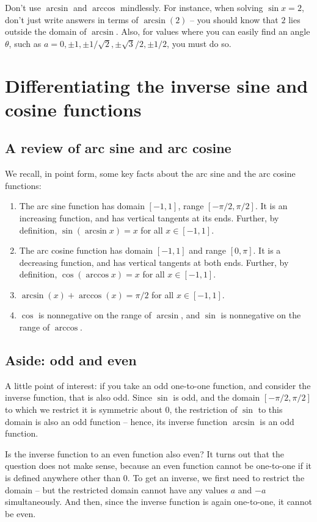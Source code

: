 \documentclass{amsart}
\begin{document}
Don't use $\arcsin$ and $\arccos$ mindlessly. For instance, when
solving $\sin x = 2$, don't just write answers in terms of
$\arcsin(2)$ -- you should know that $2$ lies outside the domain of
$\arcsin$. Also, for values where you can easily find an angle
$\theta$, such as $a = 0, \pm 1, \pm 1/\sqrt{2}, \pm \sqrt{3}/2, \pm
1/2$, you must do so.

\section{Differentiating the inverse sine and cosine functions}

\subsection{A review of arc sine and arc cosine}

We recall, in point form, some key facts about the arc sine and the
arc cosine functions:

\begin{enumerate}
\item The arc sine function has domain $[-1,1]$, range
  $[-\pi/2,\pi/2]$. It is an increasing function, and has vertical
  tangents at its ends. Further, by definition, $\sin(\arcsin x) = x$
  for all $x \in [-1,1]$.
\item The arc cosine function has domain $[-1,1]$ and range
  $[0,\pi]$. It is a decreasing function, and has vertical tangents at
  both ends. Further, by definition, $\cos(\arccos x) = x$ for all $x
  \in [-1,1]$.
\item $\arcsin(x) + \arccos(x) = \pi/2$ for all $x \in [-1,1]$.
\item $\cos$ is nonnegative on the range of $\arcsin$, and $\sin$ is
  nonnegative on the range of $\arccos$.
\end{enumerate}

\subsection*{Aside: odd and even}

A little point of interest: if you take an odd one-to-one function, and
consider the inverse function, that is also odd. Since $\sin$ is odd,
and the domain $[-\pi/2,\pi/2]$ to which we restrict it is symmetric
about $0$, the restriction of $\sin$ to this domain is also an odd
function -- hence, its inverse function $\arcsin$ is an odd function.

Is the inverse function to an even function also even? It turns out
that the question does not make sense, because an even function
cannot be one-to-one if it is defined anywhere other than $0$. To get
an inverse, we first need to restrict the domain -- but the restricted
domain cannot have any values $a$ and $-a$ simultaneously. And then,
since the inverse function is again one-to-one, it cannot be even.
\end{document}
